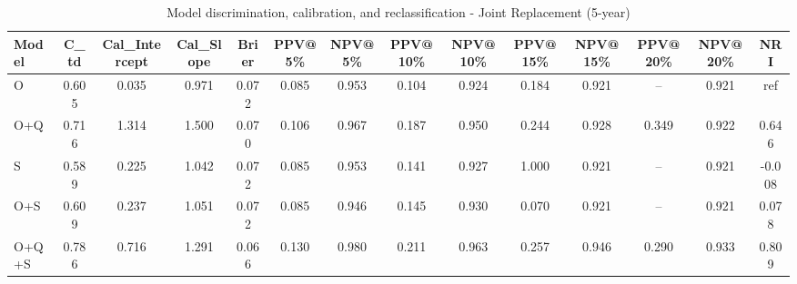 \begin{table}[htbp]
\centering
\small
\caption{Model discrimination, calibration, and reclassification - Joint Replacement (5-year)}
\label{tab:perf_joint_5y}
\begin{tabular}{lccccccccccccc}
\toprule
Model & C\_td & Cal\_Intercept & Cal\_Slope & Brier & PPV@5\% & NPV@5\% & PPV@10\% & NPV@10\% & PPV@15\% & NPV@15\% & PPV@20\% & NPV@20\% & NRI \\
\midrule
O & 0.605 & 0.035 & 0.971 & 0.072 & 0.085 & 0.953 & 0.104 & 0.924 & 0.184 & 0.921 & -- & 0.921 & ref \\
O+Q & 0.716 & 1.314 & 1.500 & 0.070 & 0.106 & 0.967 & 0.187 & 0.950 & 0.244 & 0.928 & 0.349 & 0.922 & 0.646 \\
S & 0.589 & 0.225 & 1.042 & 0.072 & 0.085 & 0.953 & 0.141 & 0.927 & 1.000 & 0.921 & -- & 0.921 & -0.008 \\
O+S & 0.609 & 0.237 & 1.051 & 0.072 & 0.085 & 0.946 & 0.145 & 0.930 & 0.070 & 0.921 & -- & 0.921 & 0.078 \\
O+Q+S & 0.786 & 0.716 & 1.291 & 0.066 & 0.130 & 0.980 & 0.211 & 0.963 & 0.257 & 0.946 & 0.290 & 0.933 & 0.809 \\
\bottomrule
\end{tabular}
\end{table}